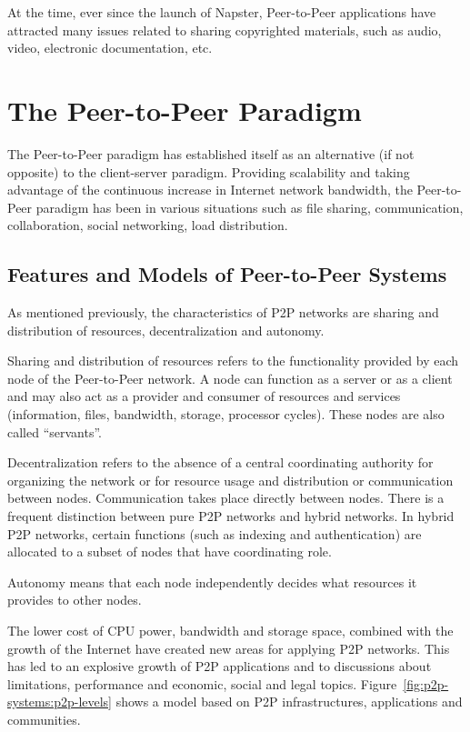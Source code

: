 At the time, ever since the launch of Napster, Peer-to-Peer applications have
attracted many issues related to sharing copyrighted materials, such as audio,
video, electronic documentation, etc.

\section{The Peer-to-Peer Paradigm}
\label{sec:p2p-systems:paragigm}

The Peer-to-Peer paradigm has established itself as an alternative (if not
opposite) to the client-server paradigm. Providing scalability and taking
advantage of the continuous increase in Internet network bandwidth, the
Peer-to-Peer paradigm has been in various situations such as file sharing,
communication, collaboration, social networking, load distribution.

\subsection{Features and Models of Peer-to-Peer Systems}

As mentioned previously, the characteristics of P2P networks are sharing and
distribution of resources, decentralization and autonomy.

Sharing and distribution of resources refers to the functionality provided by
each node of the Peer-to-Peer network. A node can function as a server or as a
client and may also act as a provider and consumer of resources and
services (information, files, bandwidth, storage, processor cycles). These
nodes are also called ``servants''.

Decentralization refers to the absence of a central coordinating authority for
organizing the network or for resource usage and distribution or communication
between nodes. Communication takes place directly between nodes. There is a
frequent distinction between pure P2P networks and hybrid networks. In
hybrid P2P networks, certain functions (such as indexing and authentication)
are allocated to a subset of nodes that have coordinating role.

Autonomy means that each node independently decides what resources it provides
to other nodes.

The lower cost of CPU power, bandwidth and storage space, combined with
the growth of the Internet have created new areas for applying P2P networks.
This has led to an explosive growth of P2P applications and to discussions about
limitations, performance and economic, social and legal topics.
Figure~\ref{fig:p2p-systems:p2p-levels} shows a model based on P2P
infrastructures, applications and communities.

